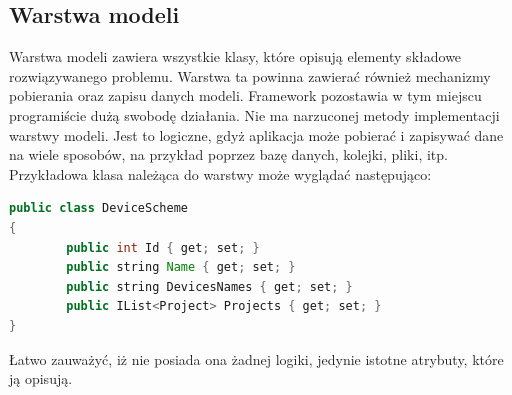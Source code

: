 \subsection{Warstwa modeli}
Warstwa modeli zawiera wszystkie klasy, które opisują elementy składowe rozwiązywanego problemu. Warstwa ta powinna zawierać również mechanizmy pobierania oraz zapisu danych modeli. 
Framework pozostawia w tym miejscu programiście dużą swobodę działania. Nie ma narzuconej metody implementacji warstwy modeli. Jest to logiczne, gdyż aplikacja może pobierać i zapisywać dane na wiele sposobów, na przykład poprzez bazę danych, kolejki, pliki, itp. 
Przykładowa klasa należąca do warstwy może wyglądać następująco:
\begin{lstlisting}[language=Java]
public class DeviceScheme
{
        public int Id { get; set; }
        public string Name { get; set; }
        public string DevicesNames { get; set; }
        public IList<Project> Projects { get; set; }
}
\end{lstlisting}
Łatwo zauważyć, iż nie posiada ona żadnej logiki, jedynie istotne atrybuty, które ją opisują.